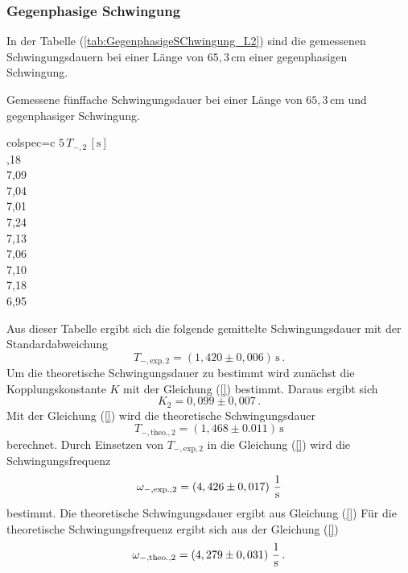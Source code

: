 \subsubsection{Gegenphasige Schwingung}
\label{sec:GegenphasigeSchwingung_LangesPendel}
In der Tabelle (\ref{tab:GegenphasigeSChwingung_L2}) sind die gemessenen Schwingungsdauern bei einer Länge von $65,3\, \unit{\centi\meter}$ einer gegenphasigen
Schwingung. 
\begin{table}[H]
  \centering
  \caption{Gemessene fünffache Schwingungsdauer bei einer Länge von $65,3\, \unit{\centi\meter}$ und gegenphasiger Schwingung.}
  \label{tab:GegenphasigeSchwingung_L2}
  \begin{tblr}{colspec={c}}
      \toprule
      $5\, T_{-, 2}\,\left[\unit{\second}\right]$\\
      ,18 \\
      7,09 \\
      7,04 \\
      7,01 \\
      7,24 \\
      7,13 \\
      7,06 \\
      7,10 \\
      7,18 \\
      6,95 \\
      \bottomrule
  \end{tblr}
\end{table}
Aus dieser Tabelle ergibt sich die folgende gemittelte Schwingungsdauer mit der Standardabweichung
$$T_{-,\text{exp},2} = \left(1,420 \pm 0,006\right)\,\unit{\second}\,.$$
Um die theoretische Schwingungsdauer zu bestimmt wird zunächst die Kopplungskonstante $K$ mit der
Gleichung (\ref{}) bestimmt. Daraus ergibt sich
$$K_{2} = 0,099 \pm 0,007\,.$$
Mit der Gleichung (\ref{}) wird die theoretische Schwingungsdauer 
$$T_{-,\text{theo.},2} = \left( 1,468 \pm 0.011 \right)\,\unit{\second}$$ berechnet. Durch Einsetzen von
$T_{-,\text{exp},2}$ in die Gleichung (\ref{}) wird die Schwingungsfrequenz 
$$\omega_{-,\text{exp.},2} = \left(4,426 \pm 0,017 \right)\, \unit[per-mode=fraction]{\per\second}$$ bestimmt. 
Die theoretische Schwingungsdauer ergibt aus Gleichung (\ref{}) 
Für die theoretische Schwingungsfrequenz ergibt sich aus der Gleichung (\ref{}) 
$$\omega_{-,\text{theo.},2} = \left( 4,279 \pm 0,031 \right)\, \unit[per-mode=fraction]{\per\second}\,.$$
%
%
